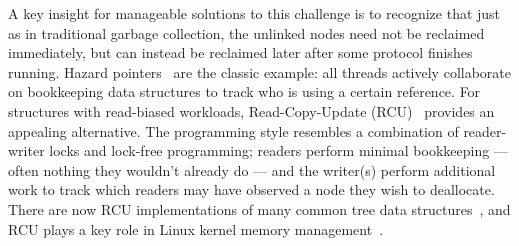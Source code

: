 A key insight for manageable solutions to this challenge is to recognize that just as in traditional garbage collection, the unlinked nodes need not be reclaimed immediately, but can instead be reclaimed later after some protocol finishes running.
Hazard pointers~\cite{Michael:2004:HPS:987524.987595} are the classic example: all threads actively collaborate on bookkeeping data structures to track who is using a certain reference.
For structures with read-biased workloads, Read-Copy-Update (RCU)~\cite{Mckenney:2004:EDD:1048173} provides an appealing alternative.  The programming style resembles a combination of reader-writer locks and lock-free programming; readers perform minimal bookkeeping --- often nothing they wouldn't already do --- and the writer(s) perform additional work to track which readers may have observed a node they wish to deallocate.
There are now RCU implementations of many common tree data structures~\cite{urcu_ieee,Triplett:2011:RSC:2002181.2002192,DBLP:conf/asplos/ClementsKZ12,mc_report,Arbel:2014:CUR:2611462.2611471,Kung:1980:CMB:320613.320619}, and
RCU plays a key role in Linux kernel memory management~\cite{Mckenney01read-copyupdate}.

